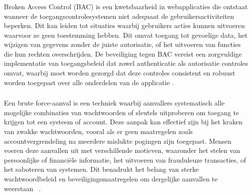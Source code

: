 \subsubsection{}
\label{sec:Broken Access Control (BAC)}

Broken Access Control (BAC) is een kwetsbaarheid in webapplicaties die ontstaat wanneer de toegangscontrolesystemen niet adequaat de gebruikersactiviteiten beperken. 
Dit kan leiden tot situaties waarbij gebruikers acties kunnen uitvoeren waarvoor ze geen toestemming hebben. Dit omvat toegang tot gevoelige data, het wijzigen 
van gegevens zonder de juiste autorisatie, of het uitvoeren van functies die hun rechten overschrijden. De beveiliging tegen BAC vereist een zorgvuldige implementatie 
van toegangsbeleid dat zowel authenticatie als autorisatie controles omvat, waarbij moet worden gezorgd dat deze controles consistent en robuust worden toegepast over 
alle onderdelen van de applicatie \autocite{Anas2024}.

\subsubsection{}
\label{sec:brute force aanvallen}
Een brute force-aanval is een techniek waarbij aanvallers systematisch alle mogelijke combinaties van wachtwoorden of sleutels uitproberen om toegang te krijgen tot een 
systeem of account. Deze aanpak kan effectief zijn bij het kraken van zwakke wachtwoorden, vooral als er geen maatregelen zoals accountvergrendeling na meerdere mislukte 
pogingen zijn toegepast. Mensen voeren deze aanvallen uit met verschillende motieven, waaronder het stelen van persoonlijke of financiële informatie, het uitvoeren van 
frauduleuze transacties, of het saboteren van systemen. Dit benadrukt het belang van sterke wachtwoordbeleid en beveiligingsmaatregelen om dergelijke aanvallen te weerstaan
~\autocite{Djukanovic2020}.


